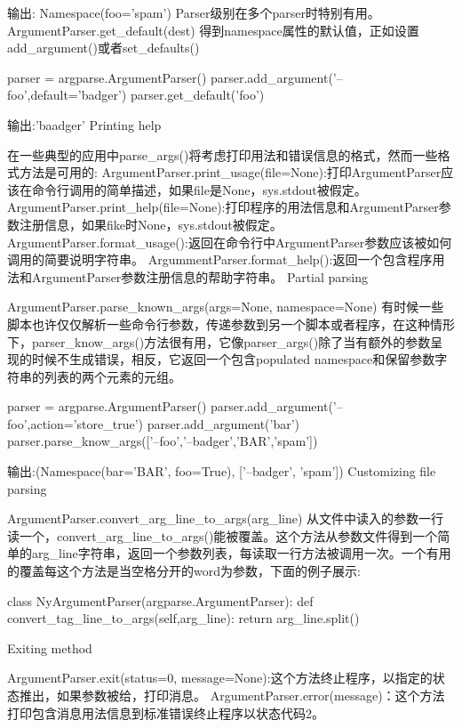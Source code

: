 输出:
Namespace(foo='spam')
Parser级别在多个parser时特别有用。
ArgumentParser.get\_default(dest)
得到namespace属性的默认值，正如设置add\_argument()或者set\_defaults()
\begin{python}
parser = argparse.ArgumentParser()
parser.add_argument('--foo',default='badger')
parser.get_default('foo')
\end{python}
输出:'baadger'
Printing help\par
在一些典型的应用中parse\_args()将考虑打印用法和错误信息的格式，然而一些格式方法是可用的:
ArgumentParser.print\_usage(file=None):打印ArgumentParser应该在命令行调用的简单描述，如果file是None，sys.stdout被假定。
ArgumentParser.print\_help(file=None):打印程序的用法信息和ArgumentParser参数注册信息，如果fike时None，sys.stdout被假定。
ArgumentParser.format\_usage():返回在命令行中ArgumentParser参数应该被如何调用的简要说明字符串。
ArgummentParser.format\_help():返回一个包含程序用法和ArgumentParser参数注册信息的帮助字符串。
Partial parsing\par
ArgumentParser.parse\_known\_args(args=None, namespace=None)\newline
有时候一些脚本也许仅仅解析一些命令行参数，传递参数到另一个脚本或者程序，在这种情形下，parser\_know\_args()方法很有用，它像parser\_args()除了当有额外的参数呈现的时候不生成错误，相反，它返回一个包含populated namespace和保留参数字符串的列表的两个元素的元组。
\begin{python}
parser = argparse.ArgumentParser()
parser.add_argument('--foo',action='store_true')
parser.add_argument('bar')
parser.parse_know_args(['--foo','--badger','BAR','spam'])
\end{python}
输出:(Namespace(bar='BAR', foo=True), ['--badger', 'spam'])
Customizing file parsing\par
ArgumentParser.convert\_arg\_line\_to\_args(arg\_line)\newline
从文件中读入的参数一行读一个，convert\_arg\_line\_to\_args()能被覆盖。这个方法从参数文件得到一个简单的arg\_line字符串，返回一个参数列表，每读取一行方法被调用一次。一个有用的覆盖每这个方法是当空格分开的word为参数，下面的例子展示:
\begin{python}
class NyArgumentParser(argparse.ArgumentParser):
    def convert_tag_line_to_args(self,arg_line):
        return arg\_line.split()
\end{python}
Exiting method\par
ArgumentParser.exit(status=0, message=None):这个方法终止程序，以指定的状态推出，如果参数被给，打印消息。
ArgumentParser.error(message)：这个方法打印包含消息用法信息到标准错误终止程序以状态代码2。
